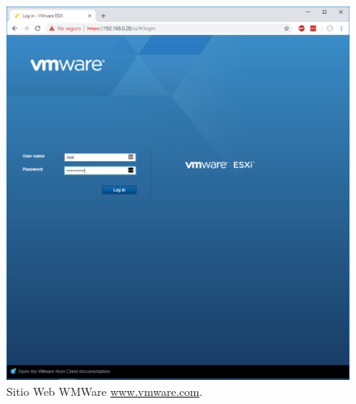 \begin{figure}[!hbtp]
	\centering
	\includegraphics[width=\linewidth]{RE01_VMwareESXi/RE_VMwareInstalacion15.png}
	\vspace{-0.2cm}
	\caption{Sitio Web WMWare \url{www.vmware.com}.\footnotemark[2]{} }
	\label{fig:VMwareInstalacion15}
\end{figure}

